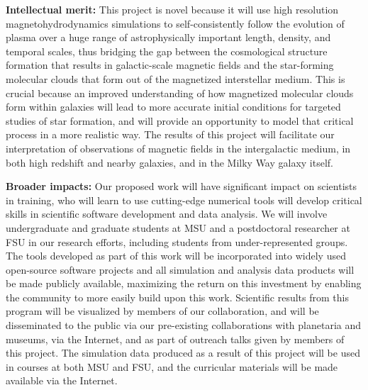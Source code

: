 \documentclass[11pt]{article}
\begin{document}
\textbf{Intellectual merit:} This project is novel because it will use
high resolution magnetohydrodynamics simulations to self-consistently
follow the evolution of plasma over a huge range of astrophysically
important length, density, and temporal scales, thus bridging the gap
between the cosmological structure formation that results in
galactic-scale magnetic fields and the star-forming molecular clouds
that form out of the magnetized interstellar medium.  This is crucial
because an improved understanding of how magnetized molecular clouds
form within galaxies will lead to more accurate initial conditions for
targeted studies of star formation, and will provide an opportunity to
model that critical process in a more realistic way.  The results of
this project will facilitate our interpretation of observations of
magnetic fields in the intergalactic medium, in both high redshift and
nearby galaxies, and in the Milky Way galaxy itself.

\textbf{Broader impacts:} Our proposed work will have significant
impact on scientists in training, who will learn to use cutting-edge
numerical tools will develop
critical skills in scientific software development and data analysis.
We will involve undergraduate and graduate students at  MSU and a
postdoctoral researcher at 
FSU in our research efforts, including
students from under-represented groups.  The tools developed as part
of this work will be incorporated into widely used open-source
software projects and all simulation and analysis data products will
be made publicly available, maximizing the return on this investment
by enabling the community to more easily build upon this work.
Scientific results from this program will be visualized by members of
our collaboration, and will be disseminated to the public via our
pre-existing collaborations with planetaria and museums, via the
Internet, and as part of outreach talks given by members of this
project.  The simulation data produced as a result of this project
will be used in courses at both
MSU and FSU, and the curricular materials will be made
available via the Internet.

\end{document}
